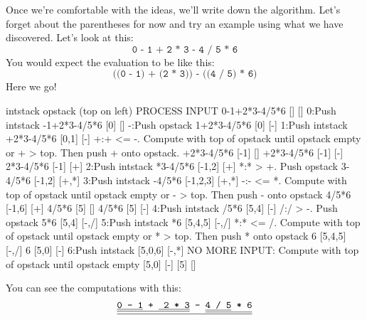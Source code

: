 Once we're comfortable with the ideas, we'll write down the
algorithm.
Let's forget about the parentheses for now and 
try an example using what we have discovered.
Let's look at this:
\[
\texttt{0 - 1 + 2 * 3 - 4 / 5 * 6}
\]
You would expect the evaluation to be like this:
\[
\texttt{((0 - 1) + (2 * 3)) - ((4 / 5) * 6)}
\]
Here we go!

{\scriptsize
\begin{console}
              intstack opstack (top on left)
                              PROCESS INPUT
0-1+2*3-4/5*6 []       []
                              0:Push intstack
 -1+2*3-4/5*6 [0]      []
                              -:Push opstack
  1+2*3-4/5*6 [0]      [-]
                              1:Push intstack
   +2*3-4/5*6 [0,1]    [-]
                              +:+ <= -. Compute with top of
                                opstack until opstack empty or
                                + > top.
                                Then push + onto opstack.
   +2*3-4/5*6 [-1]     []
   +2*3-4/5*6 [-1]     [-]
    2*3-4/5*6 [-1]     [+]
                              2:Push intstack
     *3-4/5*6 [-1,2]   [+]
                              *:* > +. Push opstack
      3-4/5*6 [-1,2]   [+,*]
                              3:Push intstack
       -4/5*6 [-1,2,3] [+,*]
                              -:- <= *. Compute with top of
                                opstack until opstack empty or
                                - > top.
                                Then push - onto opstack
        4/5*6 [-1,6]   [+]
        4/5*6 [5]      []
        4/5*6 [5]      [-]
                              4:Push intstack
         /5*6 [5,4]    [-]
                              /:/ > -. Push opstack
          5*6 [5,4]    [-,/]
                              5:Push intstack
           *6 [5,4,5]  [-,/]  
                              *:* <= /. Compute with top of
                                opstack until opstack empty or
                                * > top.
                                Then push * onto opstack
            6 [5,4,5]  [-,/]  
            6 [5,0]    [-]
                              6:Push intstack
              [5,0,6]  [-,*]  
                              NO MORE INPUT: Compute with
                              top of opstack until opstack
                              empty                             
              [5,0]    [-]
              [5]      []
\end{console}
}
You can see the computations with this:
\[
\text{\texttt{\underline{\underline{\underline{0 - 1} + \underline{ 2 * 3}} -
      \underline{\underline{4 / 5} * 6}}}}
\]
